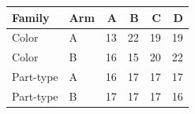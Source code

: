\begin{tabular}{@{}llrrrr@{}}
\toprule
Family & Arm & A & B & C & D\\
\midrule
Color & A & 13 & 22 & 19 & 19\\
Color & B & 16 & 15 & 20 & 22\\
Part-type & A & 16 & 17 & 17 & 17\\
Part-type & B & 17 & 17 & 17 & 16\\
\bottomrule
\end{tabular}
